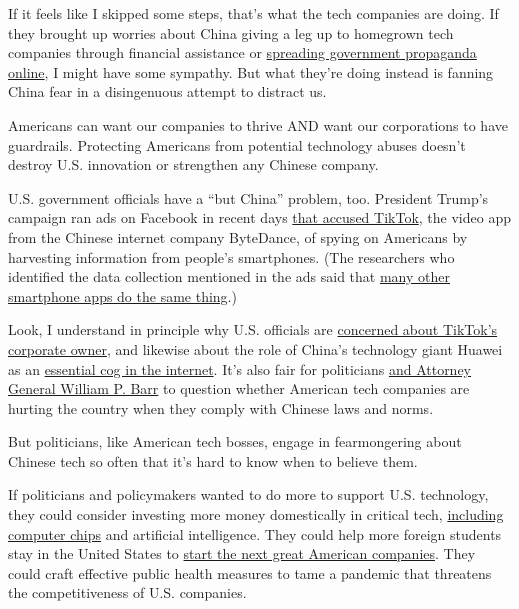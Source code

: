 If it feels like I skipped some steps, that's what the tech companies
are doing. If they brought up worries about China giving a leg up to
homegrown tech companies through financial assistance or
\href{https://www.nytimes3xbfgragh.onion/2020/04/22/us/politics/coronavirus-china-disinformation.html}{spreading
government propaganda online}, I might have some sympathy. But what
they're doing instead is fanning China fear in a disingenuous attempt to
distract us.

Americans can want our companies to thrive AND want our corporations to
have guardrails. Protecting Americans from potential technology abuses
doesn't destroy U.S. innovation or strengthen any Chinese company.

U.S. government officials have a ``but China'' problem, too. President
Trump's campaign ran ads on Facebook in recent days
\href{https://www.cnn.com/2020/07/19/politics/trump-campaign-ads-facebook-tiktok}{that
accused TikTok}, the video app from the Chinese internet company
ByteDance, of spying on Americans by harvesting information from
people's smartphones. (The researchers who identified the data
collection mentioned in the ads said that
\href{https://www.mysk.blog/2020/03/10/popular-iphone-and-ipad-apps-snooping-on-the-pasteboard/}{many
other smartphone apps do the same thing}.)

Look, I understand in principle why U.S. officials are
\href{https://www.nytimes3xbfgragh.onion/2020/07/15/technology/tiktok-washington-lobbyist.html}{concerned
about TikTok's corporate owner}, and likewise about the role of China's
technology giant Huawei as an
\href{https://www.nytimes3xbfgragh.onion/2020/07/14/business/huawei-uk-5g.html}{essential
cog in the internet}. It's also fair for politicians
\href{https://www.nytimes3xbfgragh.onion/2020/07/16/us/politics/barr-china.html}{and
Attorney General William P. Barr} to question whether American tech
companies are hurting the country when they comply with Chinese laws and
norms.

But politicians, like American tech bosses, engage in fearmongering
about Chinese tech so often that it's hard to know when to believe them.

If politicians and policymakers wanted to do more to support U.S.
technology, they could consider investing more money domestically in
critical tech,
\href{https://www.nytimes3xbfgragh.onion/2020/05/14/technology/trump-tsmc-us-chip-facility.html}{including
computer chips} and artificial intelligence. They could help more
foreign students stay in the United States to
\href{https://www.theatlantic.com/business/archive/2018/06/trump-immigrant-entrepreneurs/561989/}{start
the next great American companies}. They could craft effective public
health measures to tame a pandemic that threatens the competitiveness of
U.S. companies.

